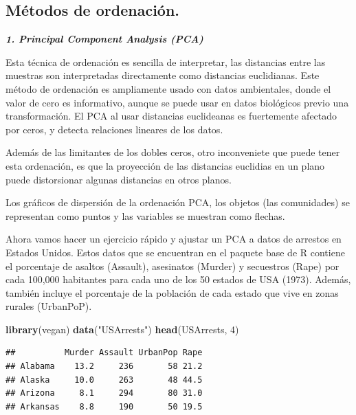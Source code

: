 \documentclass[]{book}
\newenvironment{Shaded}{\begin{snugshade}}{\end{snugshade}}
\newcommand{\KeywordTok}[1]{\textcolor[rgb]{0.13,0.29,0.53}{\textbf{{#1}}}}
\newcommand{\DecValTok}[1]{\textcolor[rgb]{0.00,0.00,0.81}{{#1}}}
\newcommand{\StringTok}[1]{\textcolor[rgb]{0.31,0.60,0.02}{{#1}}}
\newcommand{\NormalTok}[1]{{#1}}
\begin{document}
\subsection{Métodos de ordenación.}\label{metodos-de-ordenacion.}

\textbf{\emph{1. Principal Component Analysis (PCA)}}

Esta técnica de ordenación es sencilla de interpretar, las distancias
entre las muestras son interpretadas directamente como distancias
euclidianas. Este método de ordenación es ampliamente usado con datos
ambientales, donde el valor de cero es informativo, aunque se puede usar
en datos biológicos previo una transformación. El PCA al usar distancias
euclideanas es fuertemente afectado por ceros, y detecta relaciones
lineares de los datos.

Además de las limitantes de los dobles ceros, otro inconveniete que
puede tener esta ordenación, es que la proyección de las distancias
euclidias en un plano puede distorsionar algunas distancias en otros
planos.

Los gráficos de dispersión de la ordenación PCA, los objetos (las
comunidades) se representan como puntos y las variables se muestran como
flechas.

Ahora vamos hacer un ejercicio rápido y ajustar un PCA a datos de
arrestos en Estados Unidos. Estos datos que se encuentran en el paquete
base de R contiene el porcentaje de asaltos (Assault), asesinatos
(Murder) y secuestros (Rape) por cada 100,000 habitantes para cada uno
de los 50 estados de USA (1973). Además, también incluye el porcentaje
de la población de cada estado que vive en zonas rurales (UrbanPoP).

\begin{Shaded}
\begin{Highlighting}[]
\KeywordTok{library}\NormalTok{(vegan)}
\KeywordTok{data}\NormalTok{(}\StringTok{"USArrests"}\NormalTok{)}
\KeywordTok{head}\NormalTok{(USArrests, }\DecValTok{4}\NormalTok{)}
\end{Highlighting}
\end{Shaded}

\begin{verbatim}
##          Murder Assault UrbanPop Rape
## Alabama    13.2     236       58 21.2
## Alaska     10.0     263       48 44.5
## Arizona     8.1     294       80 31.0
## Arkansas    8.8     190       50 19.5
\end{verbatim}
\end{document}
